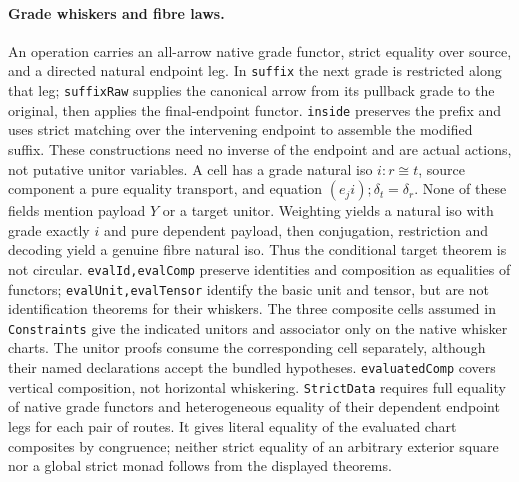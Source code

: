 \documentclass{article}
\begin{document}
\paragraph{Grade whiskers and fibre laws.}
An operation carries an all-arrow native grade functor, strict equality over source, and a directed natural endpoint leg. In \texttt{suffix} the next grade is restricted along that leg; \texttt{suffixRaw} supplies the canonical arrow from its pullback grade to the original, then applies the final-endpoint functor. \texttt{inside} preserves the prefix and uses strict matching over the intervening endpoint to assemble the modified suffix. These constructions need no inverse of the endpoint and are actual actions, not putative unitor variables. A cell has a grade natural iso $i:r\cong t$, source component a pure equality transport, and equation $(e_j i);\delta_t=\delta_r$. None of these fields mention payload $Y$ or a target unitor. Weighting yields a natural iso with grade exactly $i$ and pure dependent payload, then conjugation, restriction and decoding yield a genuine fibre natural iso. Thus the conditional target theorem is not circular. \texttt{evalId,evalComp} preserve identities and composition as equalities of functors; \texttt{evalUnit,evalTensor} identify the basic unit and tensor, but are not identification theorems for their whiskers. The three composite cells assumed in \texttt{Constraints} give the indicated unitors and associator only on the native whisker charts. The unitor proofs consume the corresponding cell separately, although their named declarations accept the bundled hypotheses. \texttt{evaluatedComp} covers vertical composition, not horizontal whiskering. \texttt{StrictData} requires full equality of native grade functors and heterogeneous equality of their dependent endpoint legs for each pair of routes. It gives literal equality of the evaluated chart composites by congruence; neither strict equality of an arbitrary exterior square nor a global strict monad follows from the displayed theorems.
\end{document}
